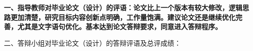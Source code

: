 \cleardoublepage{}

{
    \bfseries
    \noindent 一、指导教师对毕业论文（设计）的评语：论文比上一个版本有较大修改，逻辑思路更加清楚，研究目标内容创新点明确，工作量饱满。建议论文还是继续优化完善，尤其是文字语句优化。基本达到论文答辩要求，同意进入答辩程序。\\
    \vskip 30mm

    \signature{指导教师（签名）}

    \noindent 二、答辩小组对毕业论文（设计）的答辩评语及总评成绩：\\

    \mbox{} \vfill

    \finaleval[][][][][]

    \signature{负责人（签名）}
}
